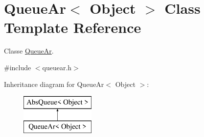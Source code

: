 \hypertarget{class_queue_ar}{}\section{Queue\+Ar$<$ Object $>$ Class Template Reference}
\label{class_queue_ar}


Classe \hyperlink{class_queue_ar}{Queue\+Ar}.  




{\ttfamily \#include $<$queuear.\+h$>$}

Inheritance diagram for Queue\+Ar$<$ Object $>$\+:\begin{figure}[H]
\begin{center}
\leavevmode
\includegraphics[height=2.000000cm]{class_queue_ar}
\end{center}
\end{figure}
